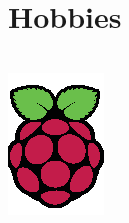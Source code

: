 \section{Hobbies}

\begin{frame}
    \frametitle{}
    \begin{columns}

        \includegraphics[width=\linewidth]{Assets/raspberrypi.png}


\end{columns}
\end{frame}

